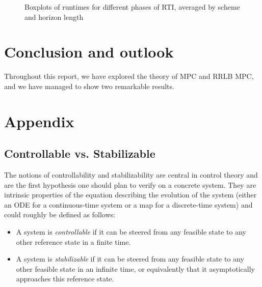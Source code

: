 \documentclass[12pt]{article}
\begin{document}
\begin{itemize}[label=\textbullet]
\begin{figure}[!ht]
		\caption{Boxplots of runtimes for different phases of RTI, averaged by scheme and horizon length}
		\label{fig:runtimes}
	\end{figure}

\end{itemize}

\section{Conclusion and outlook}

Throughout this report, we have explored the theory of MPC and RRLB MPC, and we have managed to show two remarkable results.


\newpage

\section{Appendix}
\printbibliography

\newpage

\subsection*{Controllable vs. Stabilizable}\label{sec:controllability-stabilizability}

The notions of controllability and stabilizability are central in control theory and are the first hypothesis one should plan to verify on a concrete system.
They are intrinsic properties of the equation describing the evolution of the system (either an ODE for a continuous-time system or a map for a discrete-time system) and could roughly be defined as follows:
\begin{itemize}[label=\textbullet]
	\item A system is \textit{controllable} if it can be steered from any feasible state to any other reference state in a finite time.
	\item A system is \textit{stabilizable} if it can be steered from any feasible state to any other feasible state in an infinite time, or equivalently that it asymptotically approaches this reference state.
\end{itemize}
\end{document}
